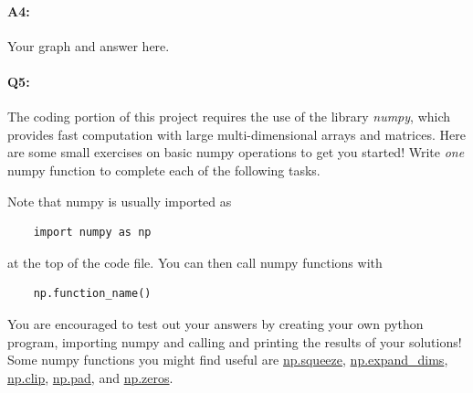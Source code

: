 \pagebreak
\paragraph{A4:} Your graph and answer here.





\pagebreak 
\paragraph{Q5:} The coding portion of this project requires the use of the library \emph{numpy}, which provides fast computation with large multi-dimensional arrays and matrices. Here are some small exercises on basic numpy operations to get you started! Write \emph{one} numpy function to complete each of the following tasks.

Note that numpy is usually imported as
\begin{verbatim}
    import numpy as np
\end{verbatim}
at the top of the code file. You can then call numpy functions with \begin{verbatim}
    np.function_name()
\end{verbatim}
You are encouraged to test out your answers by creating your own python program, importing numpy and calling and printing the results of your solutions! Some numpy functions you might find useful are \href{https://numpy.org/doc/stable/reference/generated/numpy.squeeze.html}{np.squeeze}, \href{https://numpy.org/doc/stable/reference/generated/numpy.expand_dims.html}{np.expand\_dims}, \href{https://numpy.org/doc/stable/reference/generated/numpy.clip.html}{np.clip}, \href{https://numpy.org/doc/stable/reference/generated/numpy.pad.html}{np.pad}, and \href{https://numpy.org/doc/stable/reference/generated/numpy.zeros.html}{np.zeros}.

